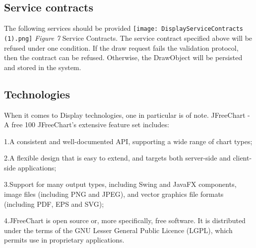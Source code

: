 \documentclass[runningheads,a4paper]{article}
\begin{document}
\subsection{\textbf{Service contracts}}
The following services should be provided
\newline
\newline
\texttt{[image: DisplayServiceContracts (1).png]}
\newline 
\textit{Figure 7} Service Contracts.
\newline
The service contract specified above will be refused under one condition. If the draw request fails the validation protocol, 
then the contract can be refused. Otherwise, the DrawObject will be persisted and stored in the system.
\newline
\subsection{\textbf{Technologies}}
\newline
When it comes to Display technologies, one in particular is of note.
 JFreeChart - A free 100%
 JFreeChart's extensive feature set includes:
	\item 1.A consistent and well-documented API, supporting a wide range of chart types;
	\item 2.A flexible design that is easy to extend, and targets both server-side and client-side applications;
	\item 3.Support for many output types, including Swing and JavaFX components, image files (including PNG and JPEG), and vector graphics file formats (including PDF, EPS and SVG);
	\item 4.JFreeChart is open source or, more specifically, free software. It is distributed under the terms of the GNU Lesser General Public Licence (LGPL), which permits use in proprietary applications.
\end{document}
